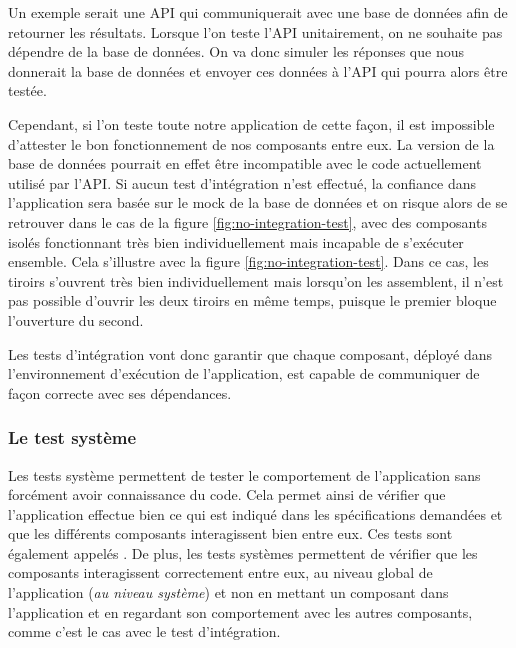 Un exemple serait une \gls{API} qui communiquerait avec une base de données afin de retourner les résultats. Lorsque l'on teste l'\gls{API} unitairement, on ne souhaite pas dépendre de la base de données. On va donc simuler les réponses que nous donnerait la base de données et envoyer ces données à l'\gls{API} qui pourra alors être testée.

Cependant, si l'on teste toute notre application de cette façon, il est impossible d'attester le bon fonctionnement de nos composants entre eux. La version de la base de données pourrait en effet être incompatible avec le code actuellement utilisé par l'\gls{API}. Si aucun test d'intégration n'est effectué, la confiance dans l'application sera basée sur le \gls{mock} de la base de données et on risque alors de se retrouver dans le cas de la figure \ref{fig:no-integration-test}, avec des composants isolés fonctionnant très bien individuellement mais incapable de s'exécuter ensemble. Cela s'illustre avec la figure \ref{fig:no-integration-test}. Dans ce cas, les tiroirs s'ouvrent très bien individuellement mais lorsqu'on les assemblent, il n'est pas possible d'ouvrir les deux tiroirs en même temps, puisque le premier bloque l'ouverture du second.


Les tests d'intégration vont donc garantir que chaque composant, déployé dans l'environnement d'exécution de l'application, est capable de communiquer de façon correcte avec ses dépendances.

\subsubsection{Le test système}

Les tests système permettent de tester le comportement de l'application sans forcément avoir connaissance du code. Cela permet ainsi de vérifier que l'application effectue bien ce qui est indiqué dans les spécifications demandées et que les différents composants interagissent bien entre eux. Ces tests sont également appelés . De plus, les tests systèmes permettent de vérifier que les composants interagissent correctement entre eux, au niveau global de l'application (\emph{au niveau système}) et non en mettant un composant dans l'application et en regardant son comportement avec les autres composants, comme c'est le cas avec le test d'intégration.

